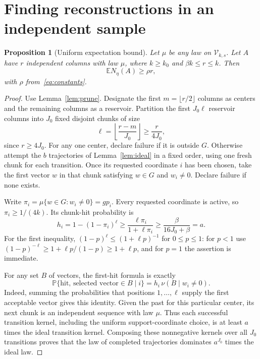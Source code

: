\documentclass[11pt,a4paper]{article}
\newtheorem{proposition}[theorem]{Proposition}
\theoremstyle{remark}\newtheorem{remark}[theorem]{Remark}
\newcommand{\E}{\mathbb E}
\newcommand{\Prob}{\mathbb P}
\begin{document}
\section{Finding reconstructions in an independent sample}
\begin{proposition}[Uniform expectation bound]\label{prop:iid}
Let $\mu$ be any law on $\mathcal V_{k,s}$. Let $A$ have $r$ independent columns with law $\mu$, where $k\ge k_0$ and $\beta k\le r\le k$. Then
\begin{equation}\label{eq:iidmean}
 \E N_\eta(A)\ge\rho r,
\end{equation}
with $\rho$ from~\eqref{eq:constants}.
\end{proposition}
\begin{proof}
Use Lemma~\ref{lem:prune}. Designate the first $m=\lfloor r/2\rfloor$ columns as centers and the remaining columns as a reservoir. Partition the first $J_0\ell$ reservoir columns into $J_0$ fixed disjoint chunks of size
\[
 \ell=\left\lfloor\frac{r-m}{J_0}\right\rfloor\ge\frac{r}{4J_0},
\]
since $r\ge4J_0$. For any one center, declare failure if it is outside $G$. Otherwise attempt the $b$ trajectories of Lemma~\ref{lem:ideal} in a fixed order, using one fresh chunk for each transition. Once its requested coordinate $i$ has been chosen, take the first vector $w$ in that chunk satisfying $w\in G$ and $w_i\ne0$. Declare failure if none exists.

Write $\pi_i=\mu\{w\in G:w_i\ne0\}=gp_i$. Every requested coordinate is active, so $\pi_i\ge1/(4k)$. Its chunk-hit probability is
\[
 h_i=1-(1-\pi_i)^\ell
 \ge\frac{\ell\pi_i}{1+\ell\pi_i}
 \ge\frac{\beta}{16J_0+\beta}=a.
\]
For the first inequality, $(1-p)^\ell\le(1+\ell p)^{-1}$ for $0\le p\le1$: for $p<1$ use $(1-p)^{-\ell}\ge1+\ell p/(1-p)\ge1+\ell p$, and for $p=1$ the assertion is immediate.

For any set $B$ of vectors, the first-hit formula is exactly
\begin{equation}\label{eq:firsthit}
 \Prob\{\text{hit, selected vector}\in B\mid i\}
 =h_i\,\nu(B\mid w_i\ne0).
\end{equation}
Indeed, summing the probabilities that positions $1,\ldots,\ell$ supply the first acceptable vector gives this identity. Given the past for this particular center, its next chunk is an independent sequence with law $\mu$. Thus each successful transition kernel, including the uniform support-coordinate choice, is at least $a$ times the ideal transition kernel. Composing these nonnegative kernels over all $J_0$ transitions proves that the law of completed trajectories dominates $a^{J_0}$ times the ideal law.


\end{proof}
\end{document}
